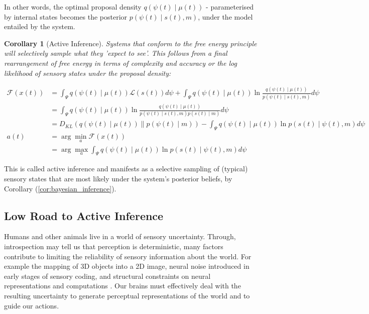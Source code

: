 \documentclass{article}
\newcommand{\refp}[1]{(\ref{#1})}
\newtheorem{corollary}{Corollary}
\begin{document}
In other words, the optimal proposal density $q(\psi(t) \mid \mu(t))$ - parameterised by internal states becomes the posterior $p(\psi(t) \mid s(t), m)$, under the model entailed by the system.

\begin{corollary}[Active Inference]
	Systems that conform to the free energy principle will selectively sample what they 'expect to see'. This follows from a final rearrangement of free energy in terms of complexity and accuracy or the log likelihood of sensory states under the proposal density:
	
	\begin{align*}
	\mathcal{F}(x(t)) & =\int_{\Psi} q(\psi(t) \mid \mu(t)) \mathcal{L}(s(t)) d \psi+\int_{\Psi} q(\psi(t) \mid \mu(t)) \ln \frac{q(\psi(t) \mid \mu(t))}{p(\psi(t) \mid s(t), m)} d \psi \\
		& =\int_{\Psi} q(\psi(t) \mid \mu(t)) \ln \frac{q(\psi(t) \mid \mu(t))}{p(\psi(t) \mid s(t), m) p(s(t) \mid m)} d \psi \\
		& =D_{K L}(q(\psi(t) \mid \mu(t)) \| p(\psi(t) \mid m))-\int_{\Psi} q(\psi(t) \mid \mu(t)) \ln p(s(t) \mid \psi(t), m) d \psi \\
		a(t) & =\arg \min _a \mathcal{F}(x(t)) \\
		& =\arg \max _a \int_{\Psi} q(\psi(t) \mid \mu(t)) \ln p(s(t) \mid \psi(t), m) d \psi
\end{align*}

\end{corollary}


This is called active inference and manifests as a selective sampling of (typical) sensory states that are most likely under the system's posterior beliefs, by Corollary \refp{cor:bayesian_inference}.

\subsection{Low Road to Active Inference}

Humans and other animals live in a world of sensory uncertainty. Through, introspection may tell us that perception is deterministic, many factors contribute to limiting the reliability of sensory information about the world. For example the mapping of 3D objects into a 2D image, neural noise introduced in early stages of sensory coding, and structural constraints on neural representations and computations \citep{knill2004bayesian}. Our brains must effectively deal with the resulting uncertainty to generate perceptual representations of the world and to guide our actions.
\end{document}
